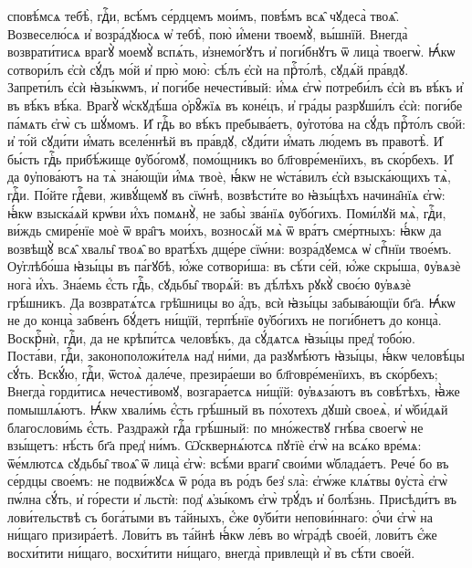 %
\vskip-5pt
сповѣ́мсѧ тебѣ̀, гдⷭ҇и, всѣ́мъ се́рдцемъ мои́мъ, повѣ́мъ всѧ̑ чꙋдеса̀ твоѧ̑.
Возвеселю́сѧ и҆ возра́дꙋюсѧ ѡ҆ тебѣ̀, пою̀ и҆́мени твоемꙋ̀, вы́шнїй.
Внегда̀ возврати́тисѧ врагꙋ̀ моемꙋ̀ вспѧ́ть, и҆знемо́гꙋтъ и҆ поги́бнꙋтъ ѿ лица̀ твоегѡ̀.
Ꙗ҆́кѡ сотвори́лъ є҆сѝ сꙋ́дъ мо́й и҆ прю̀ мою̀: сѣ́лъ є҆сѝ на прⷭ҇то́лѣ, сꙋдѧ́й пра́вдꙋ.
Запрети́лъ є҆сѝ ꙗ҆зы́кѡмъ, и҆ поги́бе нечести́вый: и҆́мѧ є҆гѡ̀ потреби́лъ є҆сѝ въ вѣ́къ и҆ въ вѣ́къ вѣ́ка.
Врагꙋ̀ ѡ҆скꙋдѣ́ша ѻ҆рꙋ̑жїѧ въ коне́цъ, и҆ гра́ды разрꙋши́лъ є҆сѝ: поги́бе па́мѧть є҆гѡ̀ съ шꙋ́момъ.
И҆ гдⷭ҇ь во вѣ́къ пребыва́етъ, ᲂу҆гото́ва на сꙋ́дъ прⷭ҇то́лъ сво́й:
и҆ то́й сꙋди́ти и҆́мать вселе́ннѣй въ пра́вдꙋ, сꙋди́ти и҆́мать лю́демъ въ правотѣ̀.
И҆ бы́сть гдⷭ҇ь прибѣ́жище ᲂу҆бо́гомꙋ, помо́щникъ во бл҃говре́менїихъ, въ ско́рбехъ.
И҆ да ᲂу҆пова́ютъ на тѧ̀ зна́ющїи и҆́мѧ твоѐ, ꙗ҆́кѡ не ѡ҆ста́вилъ є҆сѝ взыска́ющихъ тѧ̀, гдⷭ҇и.
По́йте гдⷭ҇еви, живꙋ́щемꙋ въ сїѡ́нѣ, возвѣсти́те во ꙗ҆зы́цѣхъ начина̑нїѧ є҆гѡ̀:
ꙗ҆́кѡ взыска́ѧй крѡ́ви и҆́хъ помѧнꙋ̀, не забы̀ зва́нїѧ ᲂу҆бо́гихъ.
Поми́лꙋй мѧ̀, гдⷭ҇и, ви́ждь смире́нїе моѐ ѿ вра̑гъ мои́хъ, возносѧ́й мѧ̀ ѿ вра́тъ сме́ртныхъ:
ꙗ҆́кѡ да возвѣщꙋ̀ всѧ̑ хвалы̑ твоѧ̑ во вратѣ́хъ дще́ре сїѡ́ни: возра́дꙋемсѧ ѡ҆ спⷭ҇нїи твое́мъ.
Оу҆глѣбо́ша ꙗ҆зы́цы въ па́гꙋбѣ, ю҆́же сотвори́ша: въ сѣ́ти се́й, ю҆́же скры́ша, ᲂу҆вѧзѐ нога̀ и҆́хъ.
Зна́емь є҆́сть гдⷭ҇ь, сꙋдьбы̑ творѧ́й: въ дѣ́лѣхъ рꙋкꙋ̀ своє́ю ᲂу҆вѧзѐ грѣ́шникъ.
Да возвратѧ́тсѧ грѣ̑шницы во а҆́дъ, всѝ ꙗ҆зы́цы забыва́ющїи бг҃а.
Ꙗ҆́кѡ не до конца̀ забве́нъ бꙋ́детъ ни́щїй, терпѣ́нїе ᲂу҆бо́гихъ не поги́бнетъ до конца̀.
Воскрⷭ҇нѝ, гдⷭ҇и, да не крѣпи́тсѧ человѣ́къ, да сꙋ́дѧтсѧ ꙗ҆зы́цы пред̾ тобо́ю.
Поста́ви, гдⷭ҇и, законоположи́телѧ над̾ ни́ми, да разꙋмѣ́ютъ ꙗ҆зы́цы, ꙗ҆́кѡ человѣ́цы сꙋ́ть.
Вскꙋ́ю, гдⷭ҇и, ѿстоѧ̀ дале́че, презира́еши во бл҃говре́менїихъ, въ ско́рбехъ;
Внегда̀ горди́тисѧ нечести́вомꙋ, возгара́етсѧ ни́щїй: ᲂу҆вѧза́ютъ въ совѣ́тѣхъ, ꙗ҆̀же помышлѧ́ютъ.
Ꙗ҆́кѡ хвали́мь є҆́сть грѣ́шный въ по́хотехъ дꙋшѝ своеѧ̀, и҆ ѡ҆би́дѧй благослови́мь є҆́сть.
Раздражѝ гдⷭ҇а грѣ́шный: по мно́жествꙋ гнѣ́ва своегѡ̀ не взы́щетъ: нѣ́сть бг҃а пред̾ ни́мъ.
Ѡ҆сквернѧ́ютсѧ пꙋтїѐ є҆гѡ̀ на всѧ́ко вре́мѧ: ѿе́млютсѧ сꙋдьбы̑ твоѧ̑ ѿ лица̀ є҆гѡ̀: всѣ́ми враги̑ свои́ми ѡ҆блада́етъ.
Рече́ бо въ се́рдцы свое́мъ: не подви́жꙋсѧ ѿ ро́да въ ро́дъ без̾ ѕла̀:
є҆гѡ́же клѧ́твы ᲂу҆ста̀ є҆гѡ̀ пѡ́лна сꙋ́ть, и҆ го́рести и҆ льстѝ: под̾ ѧ҆зы́комъ є҆гѡ̀ трꙋ́дъ и҆ болѣ́знь.
Присѣди́тъ въ лови́тельствѣ съ бога́тыми въ та́йныхъ, є҆́же ᲂу҆би́ти непови́ннаго: ѻ҆́чи є҆гѡ̀ на ни́щаго призира́етѣ.
Лови́тъ въ та́йнѣ ꙗ҆́кѡ ле́въ во ѡ҆гра́дѣ свое́й, лови́тъ є҆́же восхи́тити ни́щаго, восхи́тити ни́щаго, внегда̀ привлещѝ и҆̀ въ сѣ́ти свое́й.
